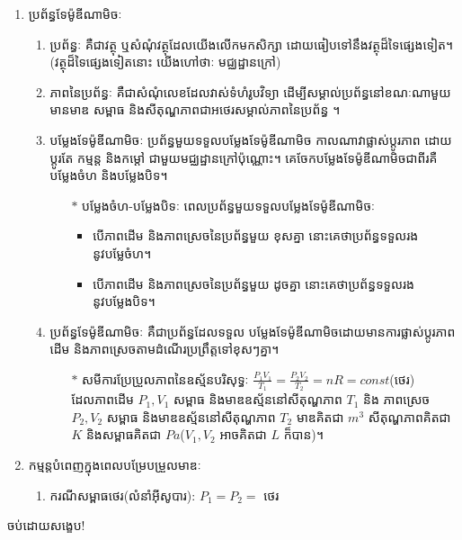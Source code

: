 \documentclass[12pt, a4paper]{article}
\begin{document}
\begin{enumerate}[I]
	\item {\kml ប្រព័ន្ធទែម៉ូឌីណាមិចៈ}
		\begin{enumerate}[m]
			\item {\kml ប្រព័ន្ធៈ} គឺជាវត្ថុ ឬសំណុំវត្ថុដែលយើងលើកមកសិក្សា ដោយធៀបទៅនឹងវត្ថុដ៏ទៃផ្សេងទៀត។\\(វត្ថុដ៏ទៃផ្សេងទៀតនោះ យើងហៅថាៈ មជ្ឈដ្ឋានក្រៅ)
			\item {\kml ភាពនៃប្រព័ន្ធៈ} គឺជាសំណុំលេខដែលវាស់ទំហំរូបវិទ្យា ដើម្បីសម្គាល់ប្រព័ន្ធនៅខណៈណាមួយ មានមាឌ សម្ពាធ និងសីតុណ្ហភាពជាអថេរសម្គាល់ភាពនៃប្រព័ន្ធ ។
			\item {\kml បម្លែងទែម៉ូឌីណាមិចៈ} ប្រព័ន្ធមួយទទួលបម្លែងទែម៉ូឌីណាមិច កាលណាវាផ្លាស់ប្តូរភាព ដោយប្តូរតែ កម្មន្ត និងកម្តៅ ជាមួយមជ្ឈដ្ឋានក្រៅប៉ុណ្ណោះ។ គេចែកបម្លែងទែម៉ូឌីណាមិចជាពីរគឺ បម្លែងចំហ និងបម្លែងបិទ។
			\begin{itemize}
				\item [$\ast$] បម្លែងចំហ-បម្លែងបិទៈ ពេលប្រព័ន្ធមួយទទួលបម្លែងទែម៉ូឌីណាមិចៈ
				\begin{itemize}
					\item បើភាពដើម និងភាពស្រេចនៃប្រព័ន្ធមួយ ខុសគ្នា នោះគេថាប្រព័ន្ធទទួលរងនូវបម្លែចំហ។
					\item បើភាពដើម និងភាពស្រេចនៃប្រព័ន្ធមួយ ដូចគ្នា នោះគេថាប្រព័ន្ធទទួលរងនូវបម្លែងបិទ។
				\end{itemize}
			\end{itemize}
			\item {\kml ប្រព័ន្ធទែម៉ូឌីណាមិចៈ} គឺជាប្រព័ន្ធដែលទទួល បម្លែងទែម៉ូឌីណាមិចដោយមានការផ្លាស់ប្តូរភាពដើម និងភាពស្រេចតាមដំណើរប្រព្រឹត្តទៅខុសៗគ្នា។
			\begin{itemize}
				\item [$\ast$] សមីការប្រែប្រួលភាពនៃឧស្ម័នបរិសុទ្ធៈ $\frac{P_1V_1}{T_1}=\frac{P_2V_2}{T_2}=nR=const$(ថេរ)\\
				ដែលភាពដើម $P_1,V_1$ សម្ពាធ និងមាឌឧស្ម័ននៅសីតុណ្ហភាព $T_1$ និង ភាពស្រេច $P_2,V_2$ សម្ពាធ និងមាឌឧស្ម័ននៅសីតុណ្ហភាព $T_2$ មាឌគិតជា $m^3$ សីតុណ្ហភាពគិតជា $K$ និងសម្ពាធគិតជា $Pa$\quad($V_1, V_2$ អាចគិតជា $L$ ក៏បាន)។
			\end{itemize}
		\end{enumerate}
	\item {\kml កម្មន្តបំពេញក្នុងពេលបម្រែបម្រួលមាឌៈ}
	\begin{enumerate}[m]
		\item {\kml ករណីសម្ពាធថេរ(លំនាំអុីសូបារ):} $P_1=P_2=$ ថេរ
	\end{enumerate}
\end{enumerate}
\begin{center}
	\sffamily\color{blue}
	\huge ចប់ដោយសង្ខេប!
\end{center}
\end{document}
